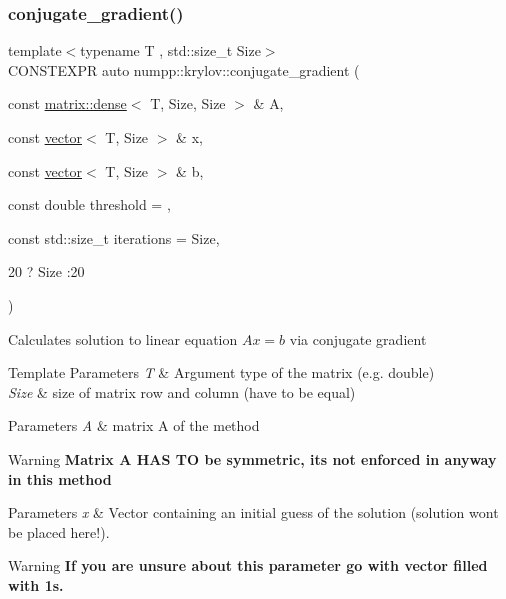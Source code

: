 \subsubsection{\texorpdfstring{conjugate\+\_\+gradient()}{conjugate\_gradient()}}
{\footnotesize\ttfamily template$<$typename T , std\+::size\+\_\+t Size$>$ \\
C\+O\+N\+S\+T\+E\+X\+PR auto numpp\+::krylov\+::conjugate\+\_\+gradient (\begin{DoxyParamCaption}\item[{const \hyperlink{classnumpp_1_1matrix_1_1dense}{matrix\+::dense}$<$ T, Size, Size $>$ \&}]{A,  }\item[{const \hyperlink{classnumpp_1_1vector}{vector}$<$ T, Size $>$ \&}]{x,  }\item[{const \hyperlink{classnumpp_1_1vector}{vector}$<$ T, Size $>$ \&}]{b,  }\item[{const double}]{threshold = {},  }\item[{const std\+::size\+\_\+t}]{iterations = {\ttfamily Size},  }\item[{20 ? Size \+:20}]{ }\end{DoxyParamCaption})}

Calculates solution to linear equation $ Ax = b $ via conjugate gradient


\begin{DoxyTemplParams}{Template Parameters}
{\em T} & Argument type of the matrix (e.\+g. double) \\
\hline
{\em Size} & size of matrix row and column (have to be equal)\\
\hline
\end{DoxyTemplParams}

\begin{DoxyParams}{Parameters}
{\em A} & matrix A of the method {\bfseries }\\
\hline
\end{DoxyParams}
\begin{DoxyWarning}{Warning}
{\bfseries  Matrix A H\+AS TO be symmetric, it\textquotesingle{}s not enforced in anyway in this method} 
\end{DoxyWarning}

\begin{DoxyParams}{Parameters}
{\em x} & Vector containing an initial guess of the solution (solution won\textquotesingle{}t be placed here!). {\bfseries }\\
\hline
\end{DoxyParams}
\begin{DoxyWarning}{Warning}
{\bfseries  If you are unsure about this parameter go with vector filled with 1\textquotesingle{}s.} 
\end{DoxyWarning}

